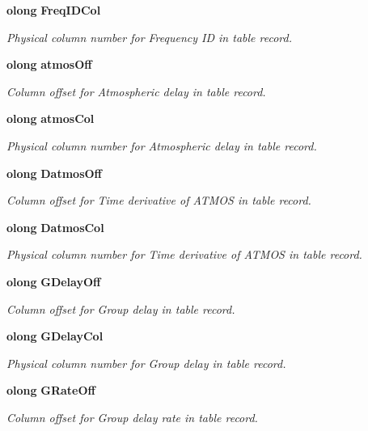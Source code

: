 \begin{CompactItemize}
{\bf olong} {\bf Freq\-IDCol}
\begin{CompactList}\small\item\em Physical column number for Frequency ID in table record. \item\end{CompactList}\item 
{\bf olong} {\bf atmos\-Off}
\begin{CompactList}\small\item\em Column offset for Atmospheric delay in table record. \item\end{CompactList}\item 
{\bf olong} {\bf atmos\-Col}
\begin{CompactList}\small\item\em Physical column number for Atmospheric delay in table record. \item\end{CompactList}\item 
{\bf olong} {\bf Datmos\-Off}
\begin{CompactList}\small\item\em Column offset for Time derivative of ATMOS in table record. \item\end{CompactList}\item 
{\bf olong} {\bf Datmos\-Col}
\begin{CompactList}\small\item\em Physical column number for Time derivative of ATMOS in table record. \item\end{CompactList}\item 
{\bf olong} {\bf GDelay\-Off}
\begin{CompactList}\small\item\em Column offset for Group delay in table record. \item\end{CompactList}\item 
{\bf olong} {\bf GDelay\-Col}
\begin{CompactList}\small\item\em Physical column number for Group delay in table record. \item\end{CompactList}\item 
{\bf olong} {\bf GRate\-Off}
\begin{CompactList}\small\item\em Column offset for Group delay rate in table record. \item\end{CompactList}\item 

\end{CompactItemize}
